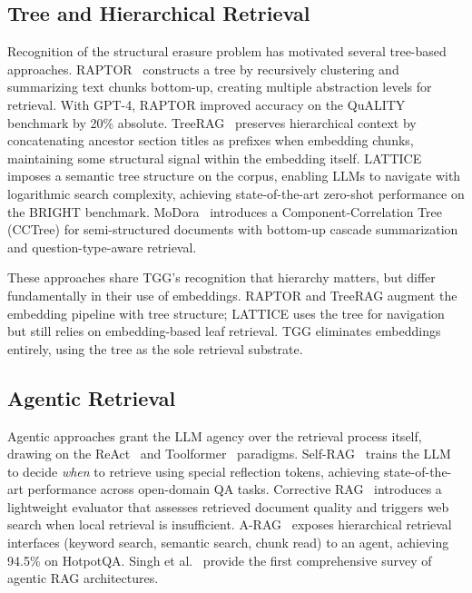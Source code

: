 \documentclass[conference]{IEEEtran}
\begin{document}
\subsection{Tree and Hierarchical Retrieval}

Recognition of the structural erasure problem has motivated several tree-based approaches. RAPTOR~\cite{sarthi2024raptor} constructs a tree by recursively clustering and summarizing text chunks bottom-up, creating multiple abstraction levels for retrieval. With GPT-4, RAPTOR improved accuracy on the QuALITY benchmark by 20\% absolute. TreeRAG~\cite{treerag2025} preserves hierarchical context by concatenating ancestor section titles as prefixes when embedding chunks, maintaining some structural signal within the embedding itself. LATTICE~\cite{gupta2025lattice} imposes a semantic tree structure on the corpus, enabling LLMs to navigate with logarithmic search complexity, achieving state-of-the-art zero-shot performance on the BRIGHT benchmark. MoDora~\cite{xu2026modora} introduces a Component-Correlation Tree (CCTree) for semi-structured documents with bottom-up cascade summarization and question-type-aware retrieval.

These approaches share TGG's recognition that hierarchy matters, but differ fundamentally in their use of embeddings. RAPTOR and TreeRAG augment the embedding pipeline with tree structure; LATTICE uses the tree for navigation but still relies on embedding-based leaf retrieval. TGG eliminates embeddings entirely, using the tree as the sole retrieval substrate.

\subsection{Agentic Retrieval}

Agentic approaches grant the LLM agency over the retrieval process itself, drawing on the ReAct~\cite{yao2023react} and Toolformer~\cite{schick2024toolformer} paradigms. Self-RAG~\cite{asai2024selfrag} trains the LLM to decide \textit{when} to retrieve using special reflection tokens, achieving state-of-the-art performance across open-domain QA tasks. Corrective RAG~\cite{yan2024corrective} introduces a lightweight evaluator that assesses retrieved document quality and triggers web search when local retrieval is insufficient. A-RAG~\cite{du2026arag} exposes hierarchical retrieval interfaces (keyword search, semantic search, chunk read) to an agent, achieving 94.5\% on HotpotQA. Singh et al.~\cite{singh2025agenticrag} provide the first comprehensive survey of agentic RAG architectures.
\end{document}
